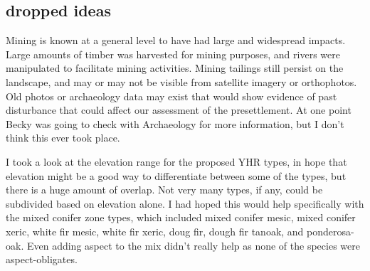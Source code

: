 \documentclass{book}
\begin{document}
\subsection{dropped ideas}
Mining is known at a general level to have had large and widespread impacts. Large amounts of timber was harvested for mining purposes, and rivers were manipulated to facilitate mining activities. Mining tailings still persist on the landscape, and may or may not be visible from satellite imagery or orthophotos. Old photos or archaeology data may exist that would show evidence of past disturbance that could affect our assessment of the presettlement. At one point Becky was going to check with Archaeology for more information, but I don't think this ever took place.

I took a look at the elevation range for the proposed YHR types, in hope that elevation might be a good way to differentiate between some of the types, but there is a huge amount of overlap. Not very many types, if any, could be subdivided based on elevation alone. I had hoped this would help specifically with the mixed conifer zone types, which included mixed conifer mesic, mixed conifer xeric, white fir mesic, white fir xeric, doug fir, dough fir tanoak, and ponderosa-oak. Even adding aspect to the mix didn't really help as none of the species were aspect-obligates.

 

\mainmatter 
 
 
 
 
 

\backmatter 
 
 
\end{document}
